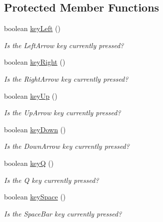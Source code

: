 \subsection*{Protected Member Functions}
\begin{DoxyCompactItemize}
\item 
boolean \mbox{\hyperlink{classbridges_1_1games_1_1_non_blocking_game_ac8b9a6d6d4074105af6d28995091bd2b}{key\+Left}} ()
\begin{DoxyCompactList}\small\item\em Is the Left\+Arrow key currently pressed? \end{DoxyCompactList}\item 
boolean \mbox{\hyperlink{classbridges_1_1games_1_1_non_blocking_game_a5a3db63942e995409daaf6b89f88b203}{key\+Right}} ()
\begin{DoxyCompactList}\small\item\em Is the Right\+Arrow key currently pressed? \end{DoxyCompactList}\item 
boolean \mbox{\hyperlink{classbridges_1_1games_1_1_non_blocking_game_a524c340fabec1b7a69aa742e1347b7b4}{key\+Up}} ()
\begin{DoxyCompactList}\small\item\em Is the Up\+Arrow key currently pressed? \end{DoxyCompactList}\item 
boolean \mbox{\hyperlink{classbridges_1_1games_1_1_non_blocking_game_ac59c5ac18a456cc1d69ec8d42a311840}{key\+Down}} ()
\begin{DoxyCompactList}\small\item\em Is the Down\+Arrow key currently pressed? \end{DoxyCompactList}\item 
boolean \mbox{\hyperlink{classbridges_1_1games_1_1_non_blocking_game_a4075b3185f2fe0d20c9ed9957c448aee}{keyQ}} ()
\begin{DoxyCompactList}\small\item\em Is the Q key currently pressed? \end{DoxyCompactList}\item 
boolean \mbox{\hyperlink{classbridges_1_1games_1_1_non_blocking_game_a4ff32a8ba8aeb3f438751729f7380d16}{key\+Space}} ()
\begin{DoxyCompactList}\small\item\em Is the Space\+Bar key currently pressed? \end{DoxyCompactList}\item 

\end{DoxyCompactItemize}
